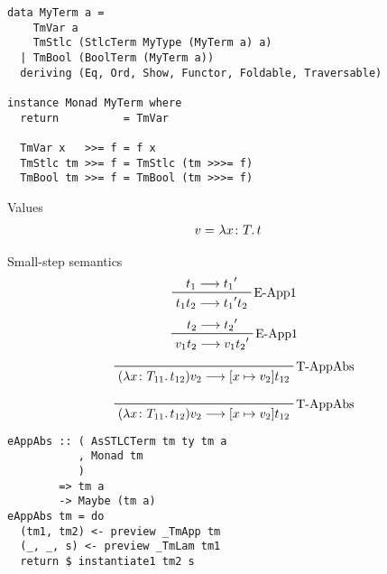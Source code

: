 \documentclass[aspectration=169]{beamer}
\begin{document}
\begin{frame}[fragile]
  \begin{verbatim}
data MyTerm a =
    TmVar a
    TmStlc (StlcTerm MyType (MyTerm a) a)
  | TmBool (BoolTerm (MyTerm a))
  deriving (Eq, Ord, Show, Functor, Foldable, Traversable)

instance Monad MyTerm where
  return          = TmVar

  TmVar x   >>= f = f x
  TmStlc tm >>= f = TmStlc (tm >>>= f)
  TmBool tm >>= f = TmBool (tm >>>= f)
  \end{verbatim}  
\end{frame}

\begin{frame}[c]
  Values
  \begin{displaymath}
    \begin{aligned}
v =& \ \lambda x \colon T \ldotp t
    \end{aligned}
  \end{displaymath}
\end{frame}

\begin{frame}
  Small-step semantics
  \begin{displaymath}  
    \prftree[r]{E-App1}
    {t_1 \longrightarrow {t_1}^{\prime} }
    {t_1 t_2 \longrightarrow {t_1}^{\prime} t_2}
  \end{displaymath}  
  \begin{displaymath}  
    \prftree[r]{E-App1}
    {t_2 \longrightarrow {t_2}^{\prime} }
    {v_1 t_2 \longrightarrow v_1 {t_2}^{\prime}}
  \end{displaymath}  
  \begin{displaymath}  
    \prftree[r]{T-AppAbs}
    {(\lambda x \colon T_{11} \ldotp t_{12})v_2 \longrightarrow [x \mapsto v_2]t_{12}}
  \end{displaymath}  
\end{frame}

\begin{frame}[fragile]
  \begin{displaymath}  
    \prftree[r]{T-AppAbs}
    {(\lambda x \colon T_{11} \ldotp t_{12})v_2 \longrightarrow [x \mapsto v_2]t_{12}}
  \end{displaymath}  
  \begin{verbatim}
eAppAbs :: ( AsSTLCTerm tm ty tm a
           , Monad tm 
           )
        => tm a
        -> Maybe (tm a)
eAppAbs tm = do
  (tm1, tm2) <- preview _TmApp tm
  (_, _, s) <- preview _TmLam tm1
  return $ instantiate1 tm2 s
  \end{verbatim}  
\end{frame}
\end{document}
